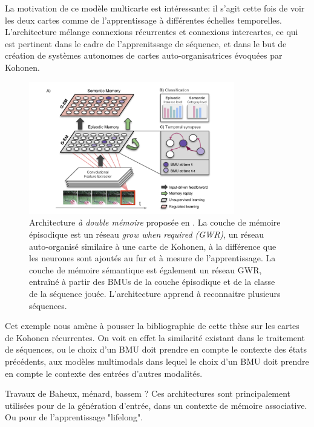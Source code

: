 \documentclass[../main]{subfiles}
\begin{document}
La motivation de ce modèle multicarte est intéressante: il s'agit cette fois de voir les deux cartes comme de l'apprentissage à différentes échelles temporelles. L'architecture mélange connexions récurrentes et connexions intercartes, ce qui est pertinent dans le cadre de l'apprenitssage de séquence, et dans le but de création de systèmes autonomes de cartes auto-organisatrices évoquées par Kohonen.


\begin{figure}
    \centering
    \includegraphics[width=0.8\textwidth]{Parisi_2020.pdf}
    \caption{Architecture \emph{à double mémoire} proposée en \cite{parisiLL}. La couche de mémoire épisodique est un réseau \emph{grow when required (GWR)}, un réseau auto-organisé similaire à une carte de Kohonen, à la différence que les neurones sont ajoutés au fur et à mesure de l'apprentissage. La couche de mémoire sémantique est également un réseau GWR, entraîné à partir des BMUs de la couche épisodique et de la classe de la séquence jouée. L'architecture apprend à reconnaitre plusieurs séquences.\label{fig:gdm_parisi}}
\end{figure}

Cet exemple nous amène à pousser la bibliographie de cette thèse sur les cartes de Kohonen récurrentes. On voit en effet la similarité existant dans le traitement de séquences, ou le choix d'un BMU doit prendre en compte le contexte des états précédents, aux modèles multimodals dans lequel le choix d'un BMU doit prendre en compte le contexte des entrées d'autres modalités.



Travaux de Baheux, ménard, bassem ? 
Ces architectures sont principalement utilisées pour de la génération d'entrée, dans un contexte de mémoire associative. Ou pour de l'apprentissage "lifelong".
\end{document}
